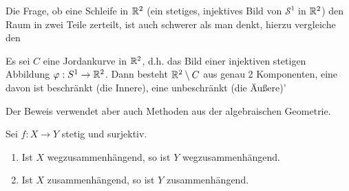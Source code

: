 \begin{remark*}
    Die Frage, ob eine Schleife in $\mathbb{R}^2$ (ein stetiges, injektives Bild von $\mathcal{S}^1$ in $\mathbb{R}^2$) den Raum in zwei Teile zerteilt, ist auch schwerer als man denkt, hierzu vergleiche den
    \begin{theorem**}
        Es sei $C$ eine Jordankurve in  $\mathbb{R}^2$, d.h. das Bild einer injektiven stetigen Abbildung $\varphi : S^1 \to  \mathbb{R}^2$. Dann besteht $\mathbb{R}^2\setminus C$ aus genau 2 Komponenten, eine davon ist beschränkt (die Innere), eine unbeschränkt (die Äußere)'
    \end{theorem**}
    Der Beweis verwendet aber auch Methoden aus der algebraischen Geometrie.
\end{remark*}

\begin{comment} %
Zur Motivation der Definition für den Zusammenhang: Man sollte über Zusammenhang eher wie in der Graphentheorie nachdenken.
Das Königsberger Brückenproblem ist gewissermaßen ein 'Urproblem der Topologie'.
\end{comment}

\begin{lemma}\label{lm:bilder-von-zusammenhängenden-räumen-sind-zusammenhängend}
    Sei $f: X \to  Y$ stetig und surjektiv.
    \begin{enumerate}[1)]
        \item Ist $X$ wegzusammenhängend, so ist  $Y$ wegzusammenhängend.
        \item Ist  $X$ zusammenhängend, so ist $Y$ zusammenhängend.
    \end{enumerate}
\end{lemma}

